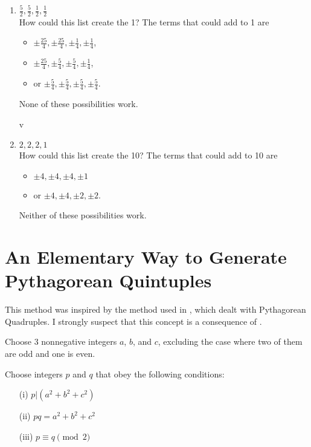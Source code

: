 \documentclass[12pt]{article}
\theoremstyle{definition}
\numberwithin{equation}{section}
\begin{document}
\begin{appendices}
\begin{enumerate}
\item $ \frac{5}{2},\frac{5}{2}, \frac{1}{2}, \frac{1}{2}  $\\
How could this list create the 1?
The terms that could add to 1 are
\begin{itemize}
\item$ \pm\frac{25}{4},\pm\frac{25}{4}, \pm\frac{1}{4}, \pm\frac{1}{4}  $,
\item$ \pm\frac{25}{4},\pm\frac{5}{4}, \pm\frac{5}{4}, \pm\frac{1}{4}  $,
\item or $ \pm\frac{5}{4},\pm\frac{5}{4}, \pm\frac{5}{4}, \pm\frac{5}{4}  $. 
\end{itemize}
None of these possibilities work.

v\item $2,2,2,1$\\
How could this list create the 10?
The terms that could add to 10 are
\begin{itemize}
\item$ \pm4,\pm4, \pm4, \pm1  $  
\item or $ \pm4,\pm4, \pm2, \pm2  $.
\end{itemize}
Neither of these possibilities work.


\end {enumerate}


\section{An Elementary Way to Generate Pythagorean Quintuples}
\label{appendix_B}

This method was inspired by the method used in \cite{New_Path}, which 
dealt with Pythagorean Quadruples. I strongly suspect that this concept
is a consequence of \cite{Formalized_New_Path}.


Choose 3 nonnegative integers $a$, $b$, and $c$, excluding the case 
where two of them are odd and one is even.





Choose integers $p$ and $q$ that obey the following 
conditions:


\begin{itemize}
\item[(i)]
$p|(a^2 + b^2 + c^2)$ 


\item[(ii)]
$pq = a^2 + b^2 + c^2$ 



\item[(iii)]
$p \equiv q \pmod 2$




\end{itemize}
\end{appendices}
\end{document}
